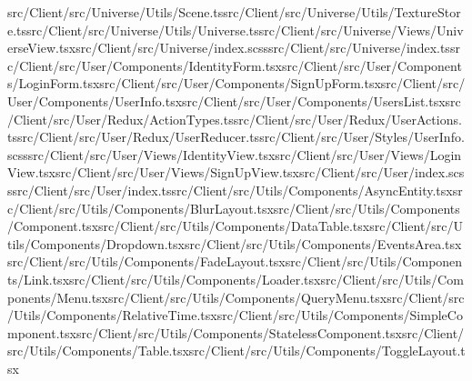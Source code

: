 \documentclass[a4paper,12pt]{article}
\begin{document}
src/Client/src/Universe/Utils/Scene.ts\newline src/Client/src/Universe/Utils/TextureStore.ts\newline src/Client/src/Universe/Utils/Universe.ts\newline src/Client/src/Universe/Views/UniverseView.tsx\newline src/Client/src/Universe/index.scss\newline src/Client/src/Universe/index.ts\newline src/Client/src/User/Components/IdentityForm.tsx\newline src/Client/src/User/Components/LoginForm.tsx\newline src/Client/src/User/Components/SignUpForm.tsx\newline src/Client/src/User/Components/UserInfo.tsx\newline src/Client/src/User/Components/UsersList.tsx\newline src/Client/src/User/Redux/ActionTypes.ts\newline src/Client/src/User/Redux/UserActions.ts\newline src/Client/src/User/Redux/UserReducer.ts\newline src/Client/src/User/Styles/UserInfo.scss\newline src/Client/src/User/Views/IdentityView.tsx\newline src/Client/src/User/Views/LoginView.tsx\newline src/Client/src/User/Views/SignUpView.tsx\newline src/Client/src/User/index.scss\newline src/Client/src/User/index.ts\newline src/Client/src/Utils/Components/AsyncEntity.tsx\newline src/Client/src/Utils/Components/BlurLayout.tsx\newline src/Client/src/Utils/Components/Component.tsx\newline src/Client/src/Utils/Components/DataTable.tsx\newline src/Client/src/Utils/Components/Dropdown.tsx\newline src/Client/src/Utils/Components/EventsArea.tsx\newline src/Client/src/Utils/Components/FadeLayout.tsx\newline src/Client/src/Utils/Components/Link.tsx\newline src/Client/src/Utils/Components/Loader.tsx\newline src/Client/src/Utils/Components/Menu.tsx\newline src/Client/src/Utils/Components/QueryMenu.tsx\newline src/Client/src/Utils/Components/RelativeTime.tsx\newline src/Client/src/Utils/Components/SimpleComponent.tsx\newline src/Client/src/Utils/Components/StatelessComponent.tsx\newline src/Client/src/Utils/Components/Table.tsx\newline src/Client/src/Utils/Components/ToggleLayout.tsx\newline 
\end{document}
